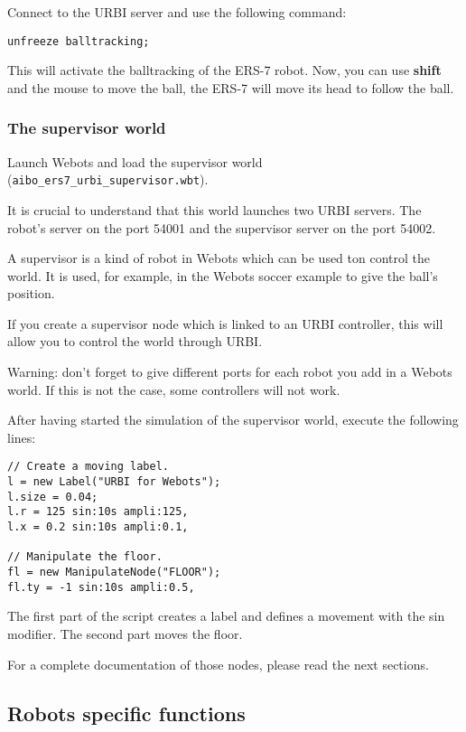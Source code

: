 Connect to the URBI server and use the following command:

\begin{lstlisting}
unfreeze balltracking;
\end{lstlisting}

 This will activate the balltracking of the ERS-{}7 robot.
Now, you can use \textbf{shift} and the mouse to move
the ball, the ERS-{}7 will move its head to follow the ball.


\subsubsection{The supervisor world}
\label{webots.builtin.worlds.supervisor}%

 Launch Webots and load the supervisor world
(\nolinkurl{aibo_ers7_urbi_supervisor.wbt}).


 It is crucial to understand that this world launches two URBI servers.
The robot's server on the port 54001 and the supervisor server on the
port 54002.


 A supervisor is a kind of robot in Webots which can be used ton control
the world. It is used, for example, in the Webots soccer example to give
the ball's position.


 If you create a supervisor node which is linked to an URBI controller,
this will allow you to control the world through URBI.


 Warning: don't forget to give different ports for each robot you add in a
Webots world. If this is not the case, some controllers will not work.


 After having started the simulation of the supervisor world, execute
the following lines:


\begin{lstlisting}
// Create a moving label.
l = new Label("URBI for Webots");
l.size = 0.04;
l.r = 125 sin:10s ampli:125,
l.x = 0.2 sin:10s ampli:0.1,

// Manipulate the floor.
fl = new ManipulateNode("FLOOR");
fl.ty = -1 sin:10s ampli:0.5,
\end{lstlisting}

 The first part of the script creates a label and defines a movement
with the sin modifier. The second part moves the floor.


For a complete documentation of those nodes, please read the
next sections.

\subsection{Robots specific functions}
\label{webots.builtin.robots}%

